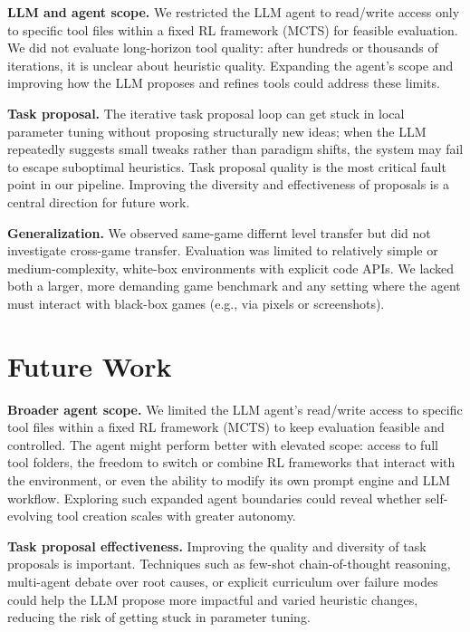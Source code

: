 \documentclass{article}
\begin{document}
\textbf{LLM and agent scope.}
We restricted the LLM agent to read/write access only to specific tool files within a fixed RL framework (MCTS) for feasible evaluation. We did not evaluate long-horizon tool quality: after hundreds or thousands of iterations, it is unclear about heuristic quality. Expanding the agent's scope and improving how the LLM proposes and refines tools could address these limits.

\textbf{Task proposal.}
The iterative task proposal loop can get stuck in local parameter tuning without proposing structurally new ideas; when the LLM repeatedly suggests small tweaks rather than paradigm shifts, the system may fail to escape suboptimal heuristics. Task proposal quality is the most critical fault point in our pipeline. Improving the diversity and effectiveness of proposals is a central direction for future work.

\textbf{Generalization.}
We observed same-game differnt level transfer but did not investigate cross-game transfer. Evaluation was limited to relatively simple or medium-complexity, white-box environments with explicit code APIs. We lacked both a larger, more demanding game benchmark and any setting where the agent must interact with black-box games (e.g., via pixels or screenshots).

\section{Future Work}
\label{sec:future}

\textbf{Broader agent scope.}
We limited the LLM agent's read/write access to specific tool files within a fixed RL framework (MCTS) to keep evaluation feasible and controlled. The agent might perform better with elevated scope: access to full tool folders, the freedom to switch or combine RL frameworks that interact with the environment, or even the ability to modify its own prompt engine and LLM workflow. Exploring such expanded agent boundaries could reveal whether self-evolving tool creation scales with greater autonomy.

\textbf{Task proposal effectiveness.}
Improving the quality and diversity of task proposals is important. Techniques such as few-shot chain-of-thought reasoning, multi-agent debate over root causes, or explicit curriculum over failure modes could help the LLM propose more impactful and varied heuristic changes, reducing the risk of getting stuck in parameter tuning.
\end{document}
